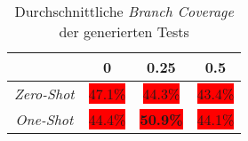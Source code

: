 \bgroup
\def\arraystretch{2}
\begin{table}[H]
	\vspace{.5cm}
	\centering		
	\begin{center}
		\begin{tabular}{|c||c|c|c|}
			\hline 
			& 0 & 0.25 & 0.5 \\
			\hline 
			\hline
			\textit{Zero-Shot} & \colorbox{red}{47.1\%} & \colorbox{red}{44.3\%} & \colorbox{red}{43.4\%} \\
			\hline
			\textit{One-Shot} & \colorbox{red}{44.4\%} & \colorbox{red}{\textbf{50.9\%}} & \colorbox{red}{44.1\%} \\
			\hline
		\end{tabular} 
	\end{center}
	\caption{Durchschnittliche \textit{Branch Coverage} der generierten Tests}
	\label{fig:branch-avg}
	\vspace{-.8cm}
\end{table}
\egroup